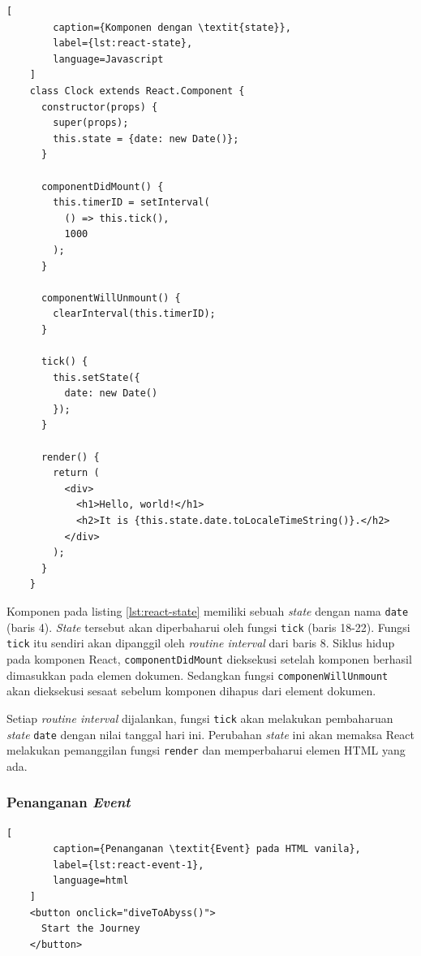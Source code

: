     \begin{lstlisting}[
        caption={Komponen dengan \textit{state}}, 
        label={lst:react-state}, 
        language=Javascript
    ]
    class Clock extends React.Component {
      constructor(props) {
        super(props);
        this.state = {date: new Date()};
      }
    
      componentDidMount() {
        this.timerID = setInterval(
          () => this.tick(),
          1000
        );
      }
    
      componentWillUnmount() {
        clearInterval(this.timerID);
      }
    
      tick() {
        this.setState({
          date: new Date()
        });
      }
    
      render() {
        return (
          <div>
            <h1>Hello, world!</h1>
            <h2>It is {this.state.date.toLocaleTimeString()}.</h2>
          </div>
        );
      }
    }
    \end{lstlisting}
    
    Komponen pada listing \ref{lst:react-state} memiliki sebuah \textit{state}
    dengan nama \texttt{date} (baris 4). \textit{State} tersebut akan
    diperbaharui oleh fungsi \texttt{tick} (baris 18-22). Fungsi \texttt{tick}
    itu sendiri akan dipanggil oleh \textit{routine interval} dari baris 8.
    Siklus hidup pada komponen React, \texttt{componentDidMount} dieksekusi
    setelah komponen berhasil dimasukkan pada elemen dokumen. Sedangkan fungsi
    \texttt{componenWillUnmount} akan dieksekusi sesaat sebelum komponen dihapus
    dari element dokumen.
    
    Setiap \textit{routine interval} dijalankan, fungsi \texttt{tick} akan
    melakukan pembaharuan \textit{state} \texttt{date} dengan nilai tanggal hari
    ini. Perubahan \textit{state} ini akan memaksa React melakukan pemanggilan
    fungsi \texttt{render} dan memperbaharui elemen HTML yang ada.
    
    \subsubsection{Penanganan \textit{Event}}
    \begin{lstlisting}[
        caption={Penanganan \textit{Event} pada HTML vanila}, 
        label={lst:react-event-1}, 
        language=html
    ]
    <button onclick="diveToAbyss()">
      Start the Journey
    </button>
    \end{lstlisting}
    
